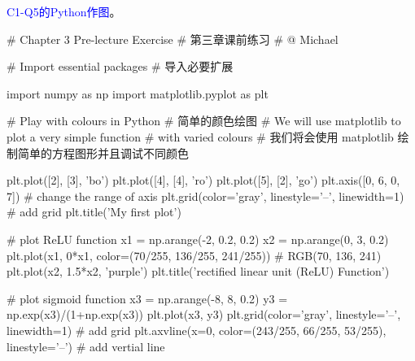 \documentclass[12pt]{article}
\numberwithin{equation}{section}
\numberwithin{figure}{section}
\begin{document}
\noindent
\textcolor{blue}{C1-Q5的Python作图}。
\begin{python}
# Chapter 3 Pre-lecture Exercise
# 第三章课前练习
# @ Michael

# Import essential packages
# 导入必要扩展

import numpy as np
import matplotlib.pyplot as plt

# Play with colours in Python
# 简单的颜色绘图
# We will use matplotlib to plot a very simple function 
# with varied colours
# 我们将会使用 matplotlib 绘制简单的方程图形并且调试不同颜色

plt.plot([2], [3], 'bo')
plt.plot([4], [4], 'ro')
plt.plot([5], [2], 'go')
plt.axis([0, 6, 0, 7])  # change the range of axis
plt.grid(color='gray', linestyle='--', linewidth=1)  # add grid
plt.title('My first plot')


# plot ReLU function
x1 = np.arange(-2, 0.2, 0.2)
x2 = np.arange(0, 3, 0.2)
plt.plot(x1, 0*x1, color=(70/255, 136/255, 241/255))
# RGB(70, 136, 241)
plt.plot(x2, 1.5*x2, 'purple')
plt.title('rectified linear unit (ReLU) Function')


# plot sigmoid function
x3 = np.arange(-8, 8, 0.2)
y3 = np.exp(x3)/(1+np.exp(x3))
plt.plot(x3, y3)
plt.grid(color='gray', linestyle='--', linewidth=1)  # add grid
plt.axvline(x=0, color=(243/255, 66/255, 53/255), linestyle='--')
# add vertial line
\end{python}
\end{document}
